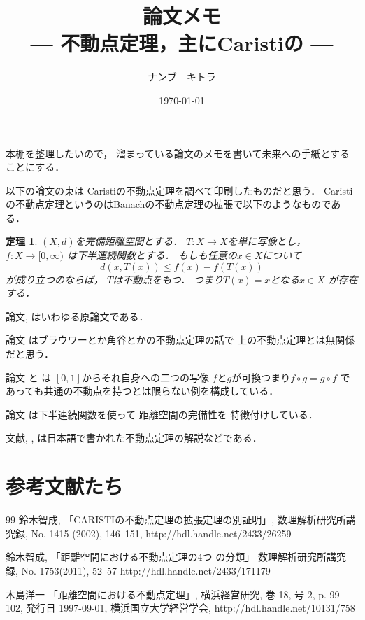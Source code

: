 \documentclass[leqno, a4paper, 12pt]{jsarticle}
\title{論文メモ
\large{\\--- 不動点定理，主にCaristiの ---}
}
\author{ナンブ　キトラ}
\date{\today}
\newtheorem{thm}{定理}
\begin{document}
\maketitle

本棚を整理したいので，
溜まっている論文のメモを書いて未来への手紙とすることにする．

以下の論文の束は
Caristiの不動点定理を調べて印刷したものだと思う．
Caristiの不動点定理というのはBanachの不動点定理の拡張で以下のようなものである．
\begin{thm}
$(X, d)$を完備距離空間とする．
$T\colon X\to X$を単に写像とし，
$f\colon X\to [0, \infty)$
は下半連続関数とする．
もしも任意の$x\in X$について
\[
d(x, T(x))\le f(x)-f(T(x))
\]
が成り立つのならば，
$T$は不動点をもつ．
つまり$T(x)=x$となる$x\in X$
が存在する．
\end{thm}

論文\cite{MR0394329}, \cite{MR0399968}
はいわゆる原論文である．


論文
\cite{MR0229101}
はブラウワーとか角谷とかの不動点定理の話で
上の不動点定理とは無関係だと思う．

論文
\cite{MR0237724} 
と
\cite{MR0236331}は
$[0, 1]$からそれ自身への二つの写像
$f$と$g$が可換つまり$f\circ g=g\circ f$
であっても共通の不動点を持つとは限らない例を構成している．


論文
\cite{MR0458359}
は下半連続関数を使って
距離空間の完備性を
特徴付けしている．

文献\cite{1}, 
\cite{2}, 
\cite{3}
は日本語で書かれた不動点定理の解説などである．



\section*{参考文献たち}

\renewcommand{\refname}{日本語の文献}
	
\begin{thebibliography}{99}
鈴木智成, 
「CARISTIの不動点定理の拡張定理の別証明」, 
数理解析研究所講究録, 
No. 1415 (2002), 146--151, 
http://hdl.handle.net/2433/26259


鈴木智成, 
「距離空間における不動点定理の4つ の分類」
数理解析研究所講究録, 
No. 1753(2011),  52--57
http://hdl.handle.net/2433/171179

木島洋一
「距離空間における不動点定理」, 
横浜経営研究, 
巻 18, 号 2, p. 99--102, 発行日 1997-09-01, 
横浜国立大学経営学会, 
http://hdl.handle.net/10131/758
\end{thebibliography}

\renewcommand{\refname}{英文参考文献}
\nocite{*}


\end{document}
